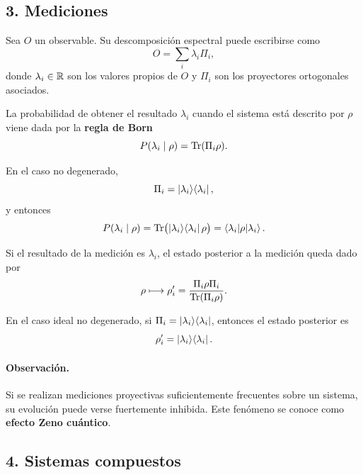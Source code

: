 \documentclass[../main.tex]{subfiles}
\begin{document}
\subsection*{3. Mediciones}

Sea $O$ un observable. Su descomposición espectral puede escribirse como
\begin{equation*}
    O=\sum_i \lambda_i \Pi_i,
\end{equation*}
donde $\lambda_i\in\mathbb{R}$ son los valores propios de $O$ y $\Pi_i$ son los proyectores ortogonales asociados.

La probabilidad de obtener el resultado $\lambda_i$ cuando el sistema está descrito por $\rho$ viene dada por la \textbf{regla de Born}
\begin{equation*}
    P(\lambda_i\mid \rho)=\Tr(\Pi_i \rho).
\end{equation*}

En el caso no degenerado,
\begin{equation*}
    \Pi_i=\ket{\lambda_i}\!\bra{\lambda_i},
\end{equation*}
y entonces
\begin{equation*}
    P(\lambda_i\mid \rho)
    =\Tr\bigl(\ket{\lambda_i}\!\bra{\lambda_i}\rho\bigr)
    =\braket{\lambda_i|\rho|\lambda_i}.
\end{equation*}

Si el resultado de la medición es $\lambda_i$, el estado posterior a la medición queda dado por
\begin{equation*}
    \rho \longmapsto \rho_i'=
    \frac{\Pi_i \rho \Pi_i}{\Tr(\Pi_i\rho)}.
\end{equation*}

En el caso ideal no degenerado, si $\Pi_i=\ket{\lambda_i}\!\bra{\lambda_i}$, entonces el estado posterior es
\begin{equation*}
    \rho_i'=\ket{\lambda_i}\!\bra{\lambda_i}.
\end{equation*}

\paragraph{Observación.}
Si se realizan mediciones proyectivas suficientemente frecuentes sobre un sistema, su evolución puede verse fuertemente inhibida. Este fenómeno se conoce como \textbf{efecto Zeno cuántico}.

\subsection*{4. Sistemas compuestos}
\end{document}
